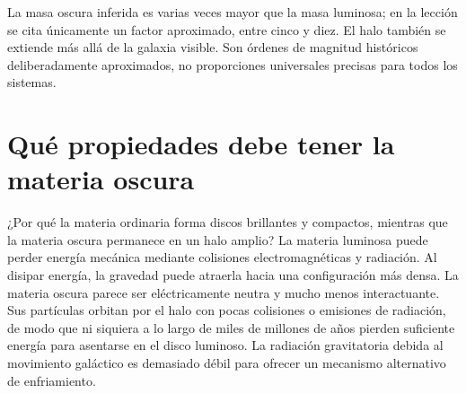 La masa oscura inferida es varias veces mayor que la masa luminosa; en la lección se cita únicamente un factor aproximado, entre cinco y diez. El halo también se extiende más allá de la galaxia visible. Son órdenes de magnitud históricos deliberadamente aproximados, no proporciones universales precisas para todos los sistemas.

\section{Qué propiedades debe tener la materia oscura}

¿Por qué la materia ordinaria forma discos brillantes y compactos, mientras que la materia oscura permanece en un halo amplio? La materia luminosa puede perder energía mecánica mediante colisiones electromagnéticas y radiación. Al disipar energía, la gravedad puede atraerla hacia una configuración más densa. La materia oscura parece ser eléctricamente neutra y mucho menos interactuante. Sus partículas orbitan por el halo con pocas colisiones o emisiones de radiación, de modo que ni siquiera a lo largo de miles de millones de años pierden suficiente energía para asentarse en el disco luminoso. La radiación gravitatoria debida al movimiento galáctico es demasiado débil para ofrecer un mecanismo alternativo de enfriamiento.

\begin{classroomqa}
\end{classroomqa}

\begin{classroomqa}
\end{classroomqa}

